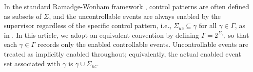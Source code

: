 \documentclass[final,5p,times,twocolumn,authoryear]{elsarticle}
\begin{document}
\begin{remark}\label{rem:uc_ctrl_pattern}
    
    In the standard Ramadge-Wonham framework \cite{ramadge1987supervisory}, control patterns are often defined as subsets of $\Sigma$, and the uncontrollable events are always enabled by the supervisor regardless of the specific control pattern, i.e., $\Sigma_{uc}\subseteq \gamma$ for all $\gamma\in\Gamma$, as in \cite{yin2016synthesis,yin2018synthesis}.
    In this article, we adopt an equivalent convention by defining $\Gamma=2^{\Sigma_c}$, so that each $\gamma\in\Gamma$ records only the enabled controllable events.
    Uncontrollable events are treated as implicitly enabled throughout; equivalently, the actual enabled event set associated with $\gamma$ is $\gamma\cup\Sigma_{uc}$.
\end{remark}
\end{document}
